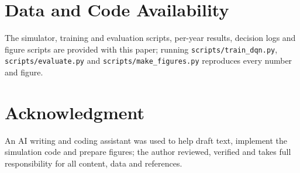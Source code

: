 \documentclass[conference]{IEEEtran}
\begin{document}
\section*{Data and Code Availability}
The simulator, training and evaluation scripts, per-year results, decision logs and figure scripts are provided with this paper; running \texttt{scripts/train\_dqn.py}, \texttt{scripts/evaluate.py} and \texttt{scripts/make\_figures.py} reproduces every number and figure.

\section*{Acknowledgment}
An AI writing and coding assistant was used to help draft text, implement the simulation code and prepare figures; the author reviewed, verified and takes full responsibility for all content, data and references.
\end{document}
